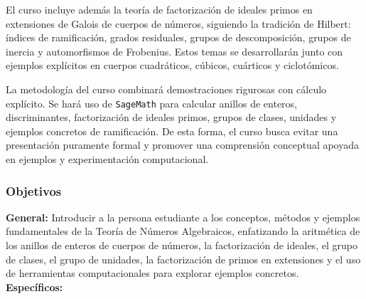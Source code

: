 \begin{refsection}
El curso incluye además la teoría de factorización de ideales primos en extensiones de Galois de cuerpos de números, siguiendo la tradición de Hilbert: índices de ramificación, grados residuales, grupos de descomposición, grupos de inercia y automorfismos de Frobenius. Estos temas se desarrollarán junto con ejemplos explícitos en cuerpos cuadráticos, cúbicos, cuárticos y ciclotómicos.

La metodología del curso combinará demostraciones rigurosas con cálculo explícito. Se hará uso de \texttt{SageMath} para calcular anillos de enteros, discriminantes, factorización de ideales primos, grupos de clases, unidades y ejemplos concretos de ramificación. De esta forma, el curso busca evitar una presentación puramente formal y promover una comprensión conceptual apoyada en ejemplos y experimentación computacional.



\subsubsection*{Objetivos}

\textbf{General:} Introducir a la persona estudiante a los conceptos, métodos y ejemplos fundamentales de la Teoría de Números Algebraicos, enfatizando la aritmética de los anillos de enteros de cuerpos de números, la factorización de ideales, el grupo de clases, el grupo de unidades, la factorización de primos en extensiones y el uso de herramientas computacionales para explorar ejemplos concretos. \\

\textbf{Específicos:}


\end{refsection}
